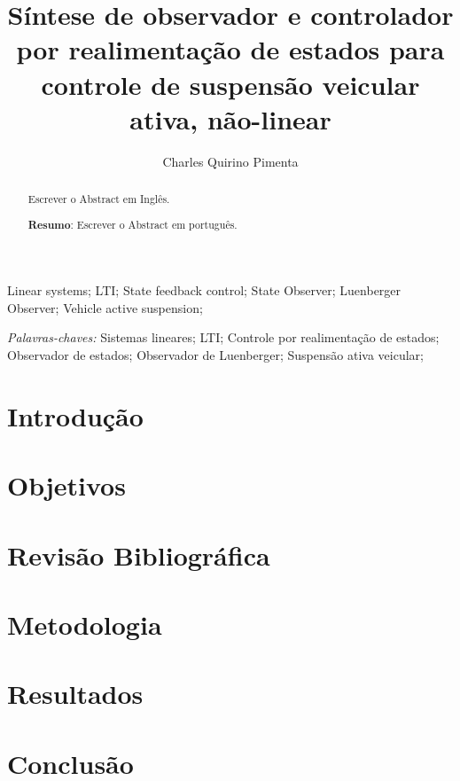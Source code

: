 \documentclass[a4paper]{ifacconf}
\begin{document}
	
	
    \begin{frontmatter}
        
        \title{Síntese de observador e controlador por realimentação de estados para controle de suspensão veicular ativa, não-linear} 

        \author[First]{Charles Quirino Pimenta} 
        
        \address[First]{Programa de Pós-Graduação em Engenharia Elétrica - Universidade Federal de 
Minas Gerais - Av. Antônio Carlos 6627, 31270-901, Belo Horizonte, MG, Brasil\\ e-mail:charlesqp@ufmg.br.}
        
        \renewcommand{\abstractname}{{\bf Abstract:~}}
        \begin{abstract}  Escrever o Abstract em Inglês.
        
        \vskip 1mm%
        {\noindent \bf Resumo}: Escrever o Abstract em português.
        \end{abstract}
        
        
        \begin{keyword} Linear systems; LTI; State feedback control; State Observer; Luenberger Observer; Vehicle active suspension;
        
        \vskip 1mm%
        {\noindent\it Palavras-chaves:} Sistemas lineares; LTI; Controle por realimentação de estados; Observador de estados; Observador de Luenberger; Suspensão ativa veicular;
        \end{keyword}
        
        
        \end{frontmatter}

    \section{Introdução}
        
    \section{Objetivos}
        
    \section{Revisão Bibliográfica}
        
    \section{Metodologia}
        
    \section{Resultados}
        
    \section{Conclusão}
        
        
    \appendix
           
\end{document}
